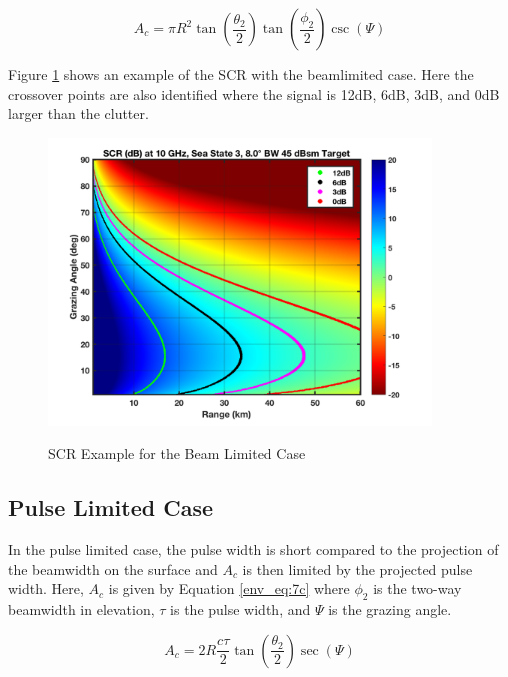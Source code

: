 \begin{equation}
\label{env_eq:7b}
A_c = \pi R^2\tan\left(\frac{\theta_2}{2}\right)\tan\left(\frac{\phi_2}{2}\right)\csc(\Psi)
\end{equation}

Figure \ref{env_fig:3z} shows an example of the SCR with the beamlimited case. Here the crossover points are also identified where the signal is 12dB, 6dB, 3dB, and 0dB larger than the clutter.
\begin{figure}[H]
  \begin{center}
\includegraphics[width=4in]{../media/multistatic/scr.png}
  \end{center}
  \renewcommand{\baselinestretch}{1} \small\normalsize
  \begin{quote}
    \caption[SCR Example for the Beam Limited Case]{SCR Example for the Beam Limited Case\label{env_fig:3z}}
  \end{quote}
\end{figure}
\renewcommand{\baselinestretch}{2} \small\normalsize

\subsection{Pulse Limited Case}
In the pulse limited case, the pulse width is short compared to the projection of the beamwidth on the surface and $A_c$ is then limited by the projected pulse width. Here, $A_c$ is given by Equation \ref{env_eq:7c} where $\phi_2$ is the two-way beamwidth  in elevation, $\tau$ is the pulse width, and $\Psi$ is the grazing angle.

\begin{equation}
\label{env_eq:7c}
A_c = 2R\frac{c\tau}{2}\tan\left(\frac{\theta_2}{2}\right)\sec(\Psi)
\end{equation}

